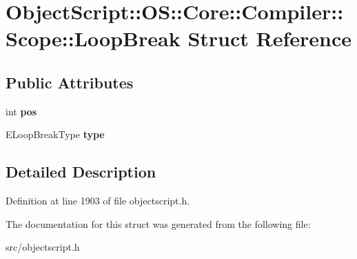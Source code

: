 \hypertarget{struct_object_script_1_1_o_s_1_1_core_1_1_compiler_1_1_scope_1_1_loop_break}{}\section{Object\+Script\+:\+:OS\+:\+:Core\+:\+:Compiler\+:\+:Scope\+:\+:Loop\+Break Struct Reference}
\label{struct_object_script_1_1_o_s_1_1_core_1_1_compiler_1_1_scope_1_1_loop_break}
\subsection*{Public Attributes}
\begin{DoxyCompactItemize}
\item 
int {\bfseries pos}\hypertarget{struct_object_script_1_1_o_s_1_1_core_1_1_compiler_1_1_scope_1_1_loop_break_a4c7da8f61ccbdd857ec7bd3a2884210b}{}\label{struct_object_script_1_1_o_s_1_1_core_1_1_compiler_1_1_scope_1_1_loop_break_a4c7da8f61ccbdd857ec7bd3a2884210b}

\item 
E\+Loop\+Break\+Type {\bfseries type}\hypertarget{struct_object_script_1_1_o_s_1_1_core_1_1_compiler_1_1_scope_1_1_loop_break_a9c9105bcdc4f1015c7fb2de1b198e2f2}{}\label{struct_object_script_1_1_o_s_1_1_core_1_1_compiler_1_1_scope_1_1_loop_break_a9c9105bcdc4f1015c7fb2de1b198e2f2}

\end{DoxyCompactItemize}


\subsection{Detailed Description}


Definition at line 1903 of file objectscript.\+h.



The documentation for this struct was generated from the following file\+:\begin{DoxyCompactItemize}
\item 
src/objectscript.\+h\end{DoxyCompactItemize}

